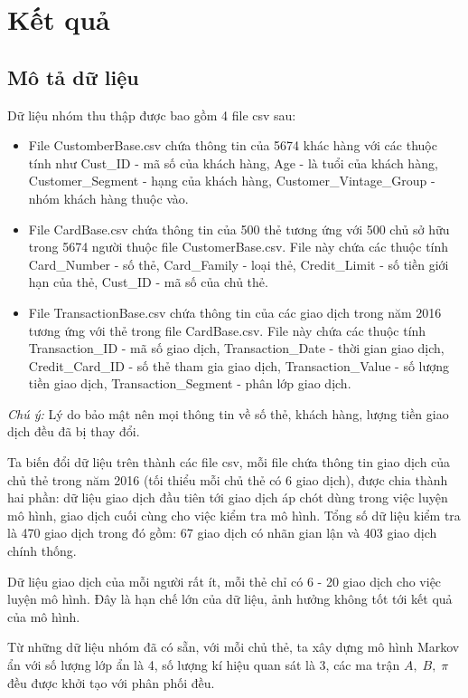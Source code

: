 \setcounter{chapter}{2}
\chapter{Kết quả}
\section{Mô tả dữ liệu}
Dữ liệu nhóm thu thập được bao gồm 4 file csv sau:
\begin{itemize}
	\item File CustomberBase.csv chứa thông tin của 5674 khác hàng với các thuộc tính như Cust\_ID - mã số của khách hàng, Age - là tuổi của khách hàng, Customer\_Segment - hạng của khách hàng, Customer\_Vintage\_Group - nhóm khách hàng thuộc vào.
	\item File CardBase.csv chứa thông tin của 500 thẻ tương ứng với 500 chủ sở hữu trong 5674 người thuộc file CustomerBase.csv. File này chứa các thuộc tính Card\_Number - số thẻ, Card\_Family - loại thẻ, Credit\_Limit - số tiền giới hạn của thẻ, Cust\_ID - mã số của chủ thẻ.
	\item File TransactionBase.csv chứa thông tin của các giao dịch trong năm 2016 tương ứng với thẻ trong file CardBase.csv. File này chứa các thuộc tính Transaction\_ID - mã số giao dịch, Transaction\_Date - thời gian giao dịch, Credit\_Card\_ID - số thẻ tham gia giao dịch, Transaction\_Value - số lượng tiền giao dịch, Transaction\_Segment - phân lớp giao dịch.
\end{itemize}
\textit{Chú ý:} Lý do bảo mật nên mọi thông tin về số thẻ, khách hàng, lượng tiền giao dịch đều đã bị thay đổi.

Ta biến đổi dữ liệu trên thành các file csv, mỗi file chứa thông tin giao dịch của chủ thẻ trong năm 2016 (tối thiểu mỗi chủ thẻ có 6 giao dịch), được chia thành hai phần: dữ liệu giao dịch đầu tiên tới giao dịch áp chót dùng trong việc luyện mô hình, giao dịch cuối cùng cho việc kiểm tra mô hình. Tổng số dữ liệu kiểm tra là 470 giao dịch trong đó gồm: 67 giao dịch có nhãn gian lận và 403 giao dịch chính thống.

Dữ liệu giao dịch của mỗi người rất ít, mỗi thẻ chỉ có 6 - 20 giao dịch cho việc luyện mô hình. Đây là hạn chế lớn của dữ liệu, ảnh hưởng không tốt tới kết quả của mô hình.

Từ những dữ liệu nhóm đã có sẵn, với mỗi chủ thẻ, ta xây dựng mô hình Markov ẩn với số lượng lớp ẩn là 4, số lượng kí hiệu quan sát là 3, các ma trận $A,\; B,\; \pi$ đều được khởi tạo với phân phối đều.

